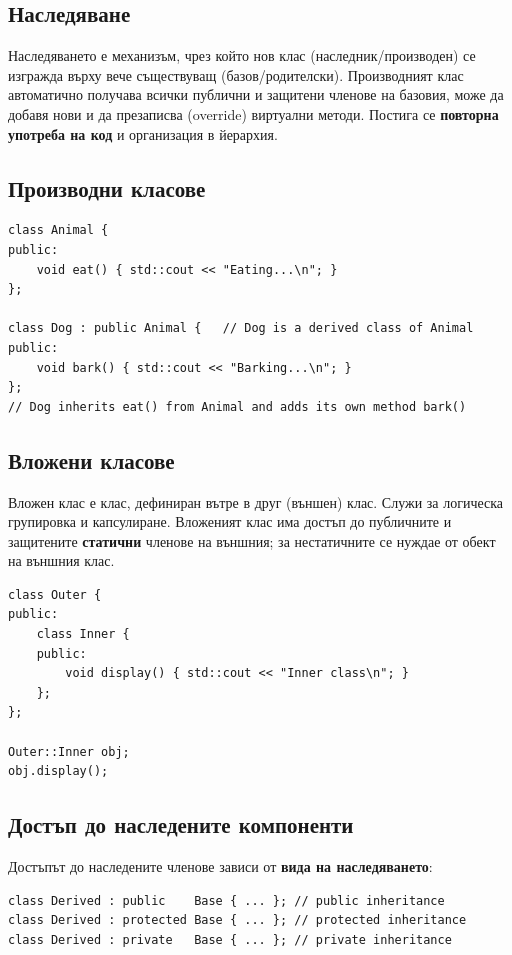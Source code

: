 \documentclass{scrartcl}
\begin{document}
\begin{FlushLeft}
\subsection{Наследяване}

Наследяването е механизъм, чрез който нов клас (наследник/производен) се изгражда върху вече съществуващ (базов/родителски). Производният клас автоматично получава всички публични и защитени членове на базовия, може да добавя нови и да презаписва (override) виртуални методи. Постига се \textbf{повторна употреба на код} и организация в йерархия.

\subsection{Производни класове}

\begin{lstlisting}
class Animal {
public:
    void eat() { std::cout << "Eating...\n"; }
};

class Dog : public Animal {   // Dog is a derived class of Animal
public:
    void bark() { std::cout << "Barking...\n"; }
};
// Dog inherits eat() from Animal and adds its own method bark()
\end{lstlisting}

\subsection{Вложени класове}

Вложен клас е клас, дефиниран вътре в друг (външен) клас. Служи за логическа групировка и капсулиране. Вложеният клас има достъп до публичните и защитените \textbf{статични} членове на външния; за нестатичните се нуждае от обект на външния клас.

\begin{lstlisting}
class Outer {
public:
    class Inner {
    public:
        void display() { std::cout << "Inner class\n"; }
    };
};

Outer::Inner obj;
obj.display();
\end{lstlisting}

\subsection{Достъп до наследените компоненти}

Достъпът до наследените членове зависи от \textbf{вида на наследяването}:

\begin{lstlisting}
class Derived : public    Base { ... }; // public inheritance
class Derived : protected Base { ... }; // protected inheritance
class Derived : private   Base { ... }; // private inheritance
\end{lstlisting}


\end{FlushLeft}
\end{document}
